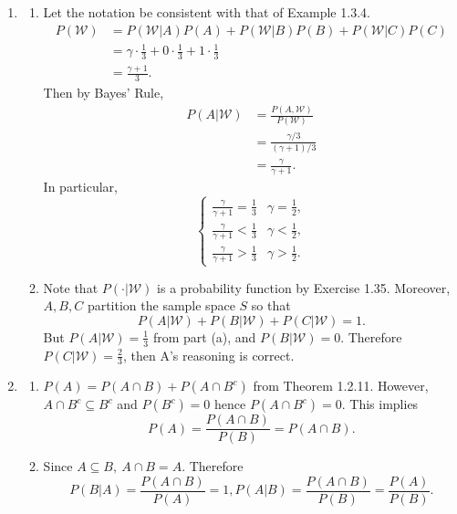 \documentclass{article}
\begin{document}
\begin{enumerate}
    \item \begin{enumerate}
        \item Let the notation be consistent with that of Example 1.3.4. \begin{align*}
            P(\mathcal{W})
            &= P(\mathcal{W}|A)P(A) + P(\mathcal{W}|B)P(B) + P(\mathcal{W}|C)P(C) \\
            &= \gamma \cdot \frac{1}{3} + 0 \cdot \frac{1}{3} + 1 \cdot \frac{1}{3} \\
            &= \frac{\gamma + 1}{3}.
        \end{align*}
        Then by Bayes' Rule,
        \begin{align*}
            P(A|\mathcal{W})
            &= \frac{P(A, \mathcal{W})}{P(\mathcal{W})} \\
            &= \frac{\gamma / 3}{(\gamma + 1) / 3} \\
            &= \frac{\gamma}{\gamma + 1}.
        \end{align*}
        In particular,
        \[ \begin{cases}
            \frac{\gamma}{\gamma + 1} = \frac{1}{3} & \gamma = \frac{1}{2}, \\
            \frac{\gamma}{\gamma + 1} < \frac{1}{3} & \gamma < \frac{1}{2}, \\
            \frac{\gamma}{\gamma + 1} > \frac{1}{3} & \gamma > \frac{1}{2}.
        \end{cases} \]

        \item Note that $P(\cdot | \mathcal{W})$ is a probability function by Exercise 1.35.
        Moreover, $A, B, C$ partition the sample space $S$ so that
        \[ P(A|\mathcal{W}) + P(B|\mathcal{W}) + P(C|\mathcal{W}) = 1. \]
        But $P(A|\mathcal{W}) = \frac{1}{3}$ from part (a), and $P(B|\mathcal{W}) = 0$.
        Therefore $P(C|\mathcal{W}) = \frac{2}{3}$, then A's reasoning is correct.
    \end{enumerate}

    \item \begin{enumerate}
        \item $P(A) = P(A \cap B) + P(A \cap B^c)$ from Theorem 1.2.11. However,
        $A \cap B^{c} \subseteq B^{c}$ and $P(B^c) = 0$ hence $P(A \cap B^{c}) = 0$.
        This implies
        \[ P(A) = \frac{P(A \cap B)}{P(B)} = P(A \cap B). \]

        \item Since $A \subseteq B, \ A \cap B = A$. Therefore
        \[ P(B|A) = \frac{P(A \cap B)}{P(A)} = 1,
        P(A|B) = \frac{P(A \cap B)}{P(B)} = \frac{P(A)}{P(B)}. \]


\end{enumerate}
\end{enumerate}
\end{document}
